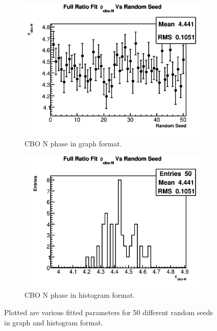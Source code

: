 \begin{figure}[]
		   	\vspace{4mm}
		   	\begin{subfigure}[t]{0.45\textwidth}
			    \centering
				\includegraphics[width=\textwidth]{RatioCBO_phi_cbo-N_Vs_Iter_Canv}
			    \caption{CBO N phase in graph format.}
		    \end{subfigure}
		    \hspace{4mm}
		    \begin{subfigure}[t]{0.45\textwidth}
			    \centering
				\includegraphics[width=\textwidth]{RatioCBO_phi_cbo-N_Vs_Iter_Canv_hist}
			    \caption{CBO N phase in histogram format.}
		    \end{subfigure}%
		\caption[RandomSeedsPars3]{Plotted are various fitted parameters for 50 different random seeds in graph and histogram format.}
		\label{fig:RandomSeedsPars3}
		\end{figure}



